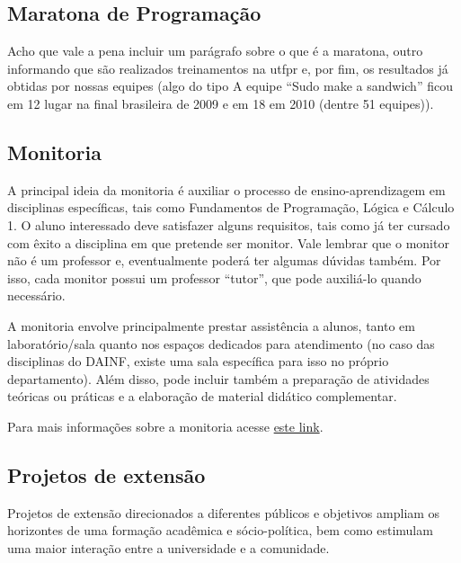\documentclass[a4paper,12pt,openany]{article}
\begin{document}
\subsection{Maratona de Programação}

Acho que vale a pena incluir um parágrafo sobre o que é a maratona, outro informando que são realizados treinamentos na utfpr e, por fim, os resultados já obtidas por nossas equipes (algo do tipo A equipe ``Sudo make a sandwich'' ficou em 12 lugar na final brasileira de 2009 e em 18 em 2010 (dentre 51 equipes)).

\subsection{Monitoria}

A principal ideia da monitoria é auxiliar o processo de ensino-aprendizagem em disciplinas específicas, tais como Fundamentos de Programação, Lógica e Cálculo 1. O aluno interessado deve satisfazer alguns requisitos, tais como já ter cursado com êxito a disciplina em que pretende ser monitor. Vale lembrar que o monitor não é um professor e, eventualmente poderá ter algumas dúvidas também. Por isso, cada monitor possui um professor ``tutor'', que pode auxiliá-lo quando necessário.

A monitoria envolve principalmente prestar assistência a alunos, tanto em laboratório/sala quanto nos espaços dedicados para atendimento (no caso das disciplinas do DAINF, existe uma sala específica para isso no próprio departamento). Além disso, pode incluir também a preparação de atividades teóricas ou práticas e a elaboração de material didático complementar.

Para mais informações sobre a monitoria acesse \href{http://www.utfpr.edu.br/estrutura-universitaria/pro-reitorias/prograd/programas-academicos/programa-de-monitoria}{este link}.


\subsection{Projetos de extensão}

Projetos de extensão direcionados a diferentes públicos e objetivos ampliam os horizontes de uma formação acadêmica e sócio-política, bem como estimulam uma maior interação entre a universidade e a comunidade. 
\end{document}
